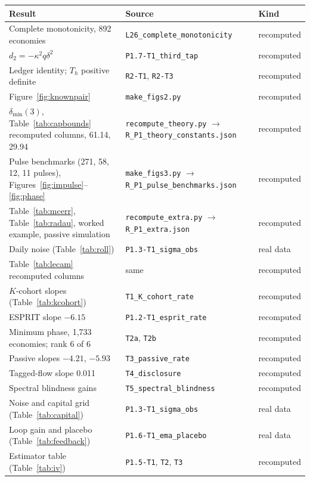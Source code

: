 \documentclass[12pt]{article}
\theoremstyle{definition}
\theoremstyle{remark}
\begin{document}
\begin{longtable}{p{}p{}p{}}
\toprule
Result & Source & Kind\\
\midrule
\endhead
Complete monotonicity, 892 economies & \nolinkurl{L26_complete_monotonicity} & recomputed\\
$d_2=-\kappa^2q\delta^2$ & \nolinkurl{P1.7-T1_third_tap} & recomputed\\
Ledger identity; $T_h$ positive definite & \nolinkurl{R2-T1}, \nolinkurl{R2-T3} & recomputed\\
Figure~\ref{fig:knownpair} & \nolinkurl{make_figs2.py} & recomputed\\
$\delta_{\min}(3)$, Table~\ref{tab:capbounds} recomputed columns, 61.14, 29.94 & \nolinkurl{recompute_theory.py} $\to$ \nolinkurl{R_P1_theory_constants.json} & recomputed\\
Pulse benchmarks (271, 58, 12, 11 pulses), Figures~\ref{fig:impulse}--\ref{fig:phase} & \nolinkurl{make_figs3.py} $\to$ \nolinkurl{R_P1_pulse_benchmarks.json} & recomputed\\
Table~\ref{tab:mcerr}, Table~\ref{tab:radau}, worked example, passive simulation & \nolinkurl{recompute_extra.py} $\to$ \nolinkurl{R_P1_extra.json} & recomputed\\
Daily noise (Table~\ref{tab:roll}) & \nolinkurl{P1.3-T1_sigma_obs} & real data\\
Table~\ref{tab:lecam} recomputed columns & same & recomputed\\
$K$-cohort slopes (Table~\ref{tab:kcohort}) & \nolinkurl{T1_K_cohort_rate} & recomputed\\
ESPRIT slope $-6.15$ & \nolinkurl{P1.2-T1_esprit_rate} & recomputed\\
Minimum phase, 1,733 economies; rank 6 of 6 & \nolinkurl{T2a}, \nolinkurl{T2b} & recomputed\\
Passive slopes $-4.21$, $-5.93$ & \nolinkurl{T3_passive_rate} & recomputed\\
Tagged-flow slope 0.011 & \nolinkurl{T4_disclosure} & recomputed\\
Spectral blindness gains & \nolinkurl{T5_spectral_blindness} & recomputed\\
Noise and capital grid (Table~\ref{tab:capital}) & \nolinkurl{P1.3-T1_sigma_obs} & real data\\
Loop gain and placebo (Table~\ref{tab:feedback}) & \nolinkurl{P1.6-T1_ema_placebo} & real data\\
Estimator table (Table~\ref{tab:iv}) & \nolinkurl{P1.5-T1}, \nolinkurl{T2}, \nolinkurl{T3} & recomputed\\

\end{longtable}
\end{document}
